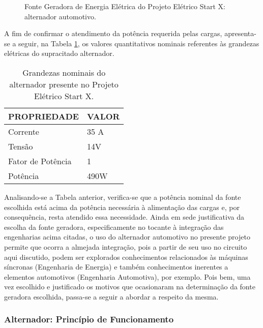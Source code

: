 \begin{figure}[h]
	\centering
	\caption{Fonte Geradora de Energia Elétrica do Projeto Elétrico Start X: alternador automotivo.}
	\label{alternador}
\end{figure}

A fim de confirmar o atendimento da potência requerida pelas cargas, apresenta-se a seguir, na Tabela \ref{grandezas-alternador}, os valores quantitativos nominais referentes às grandezas elétricas do supracitado alternador.

\begin{table}[h]
\centering
\begin{tabular}{|l|l|}
\hline
\rowcolor[HTML]{329A9D} 
PROPRIEDADE                                                           & VALOR                                                   \\ \hline
Corrente & 35 A 
\\ \hline
Tensão & 14V
\\ \hline
Fator de Potência\protect\footnotemark  & 1                                                      \\ \hline
Potência & 490W
\\ \hline
\end{tabular}
\caption{Grandezas nominais do alternador presente no Projeto Elétrico Start X.}
\label{grandezas-alternador}
\end{table}

Analisando-se a Tabela anterior, verifica-se que a potência nominal da fonte escolhida está acima da potência necessária à alimentação das cargas e, por consequência, resta atendido essa necessidade. 
Ainda em sede justificativa da escolha da fonte geradora, especificamente no tocante à integração das engenharias acima citadas, o uso do alternador automotivo no presente projeto permite que ocorra a almejada integração, pois a partir de seu uso no circuito aqui discutido, podem ser explorados conhecimentos relacionados às máquinas síncronas (Engenharia de Energia) e também conhecimentos inerentes a elementos automotivos (Engenharia Automotiva), por exemplo.
Pois bem, uma vez escolhido e justificado os motivos que ocasionaram na determinação da fonte geradora escolhida, passa-se a seguir a abordar a respeito da mesma.

\subsubsection{Alternador: Princípio de Funcionamento}
\label{alternador-funcionamento}


